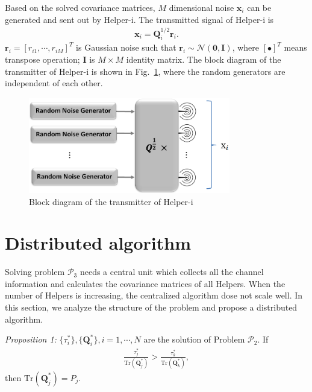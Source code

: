 \documentclass[conference]{IEEEtran}
\begin{document}
Based on the solved covariance matrices,  $M$ dimensional noise $\mathbf{x}_i$ can be generated and sent out by Helper-i. The transmitted signal of Helper-i is 
\begin{eqnarray}
\mathbf{x}_i = \mathbf{Q}_i^{1/2}\mathbf{r}_i.
\end{eqnarray} 
$\mathbf{r}_i = [r_{i1},\cdots,r_{iM}]^T$ is Gaussian noise such that $\mathbf{r}_i \sim \mathcal{N}(\mathbf{0},\mathbf{I})$, where $[\bullet]^T$ means transpose operation; $\mathbf{I}$ is $M \times M$ identity matrix. 
The block diagram of the transmitter of Helper-i is shown in Fig.~\ref{fig:transmitter}, where the random generators are independent of each other.
\begin{figure}[h]
	\centering
	\includegraphics[width=8.8cm]{transmitter.png} %
	\caption{Block diagram of the transmitter of Helper-i}
	\label{fig:transmitter}
\end{figure}

\section{Distributed algorithm} \label{sec:distributed algorithm}
Solving problem $\mathcal{P}_3$ needs a central unit which collects all the channel information and calculates the covariance matrices of all Helpers. When the number of Helpers is increasing, the centralized algorithm dose not scale well. In this section, we analyze the structure of the problem and propose a distributed algorithm. 

\emph{Proposition 1:} $\{\tau_i^*\}, \{\mathbf{Q}_i^*\}, i = 1, \cdots, N$ are the solution of Problem $\mathcal{P}_2$. If 
\begin{eqnarray}
\frac{\tau_j^*}{\mathrm{Tr}(\mathbf{Q}_j^*)} > \frac{\tau_k^*}{\mathrm{Tr}(\mathbf{Q}_k^*)} \label{eq:efficiency},
\end{eqnarray}
then $\mathrm{Tr}(\mathbf{Q}_j^*) = P_j$.
\end{document}
